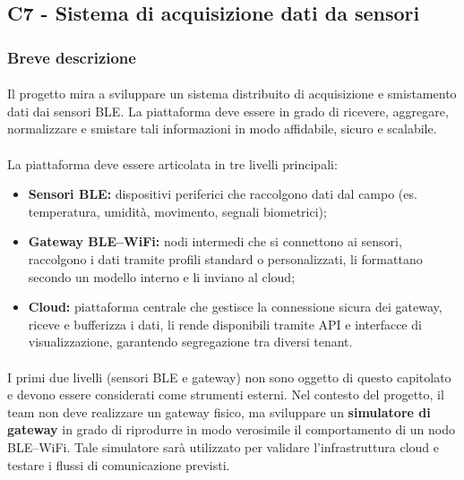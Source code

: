 \documentclass[a4paper,11pt]{article}
\begin{document}
\subsection{C7 - Sistema di acquisizione dati da sensori}
\subsubsection{Breve descrizione}
\paragraph{} 
Il progetto mira a sviluppare un sistema distribuito di acquisizione e smistamento dati dai sensori BLE. 
La piattaforma deve essere in grado di ricevere, aggregare, normalizzare e smistare tali informazioni in modo affidabile, sicuro e scalabile.

\paragraph{} 
La piattaforma deve essere articolata in tre livelli principali:

\begin{itemize}
  \item \textbf{Sensori BLE:} dispositivi periferici che raccolgono dati dal campo (es. temperatura, umidità, movimento, segnali biometrici);
  \item \textbf{Gateway BLE--WiFi:} nodi intermedi che si connettono ai sensori, raccolgono i dati tramite profili standard o personalizzati, 
  li formattano secondo un modello interno e li inviano al cloud;
  \item \textbf{Cloud:} piattaforma centrale che gestisce la connessione sicura dei gateway, riceve e bufferizza i dati, 
  li rende disponibili tramite API e interfacce di visualizzazione, garantendo segregazione tra diversi tenant.
\end{itemize}

\paragraph{} 
I primi due livelli (sensori BLE e gateway) non sono oggetto di questo capitolato e devono essere considerati come strumenti esterni. 
Nel contesto del progetto, il team non deve realizzare un gateway fisico, ma sviluppare un \textbf{simulatore di gateway} 
in grado di riprodurre in modo verosimile il comportamento di un nodo BLE--WiFi. 
Tale simulatore sarà utilizzato per validare l'infrastruttura cloud e testare i flussi di comunicazione previsti.
\end{document}
